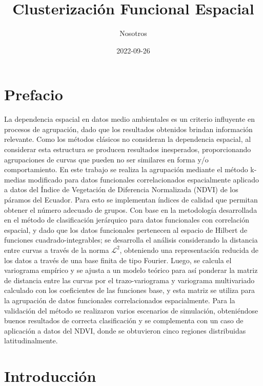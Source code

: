 \documentclass[
]{book}
\title{Clusterización Funcional Espacial}
\author{Nosotros}
\date{2022-09-26}
\begin{document}
\maketitle

{
\setcounter{tocdepth}{1}
\tableofcontents
}
\hypertarget{prefacio}{%
\chapter*{Prefacio}\label{prefacio}}

La dependencia espacial en datos medio ambientales es un criterio influyente en procesos de agrupación, dado que los resultados obtenidos brindan información relevante. Como los métodos clásicos no consideran la dependencia espacial, al considerar esta estructura se producen resultados inesperados, proporcionando agrupaciones de curvas que pueden no ser similares en forma y/o comportamiento. En este trabajo se realiza la agrupación mediante el método k-medias modificado para datos funcionales correlacionados espacialmente aplicado a datos del Índice de Vegetación de Diferencia Normalizada (NDVI) de los páramos del Ecuador. Para esto se implementan índices de calidad que permitan obtener el número adecuado de grupos. Con base en la metodología desarrollada en el método de clasificación jerárquico para datos funcionales con correlación espacial, y dado que los datos funcionales pertenecen al espacio de Hilbert de funciones cuadrado-integrables; se desarrolla el análisis considerando la distancia entre curvas a través de la norma \(\mathcal{L}^2\), obteniendo una representación reducida de los datos a través de una base finita de tipo Fourier. Luego, se calcula el variograma empírico y se ajusta a un modelo teórico para así ponderar la matriz de distancia entre las curvas por el trazo-variograma y variograma multivariado calculado con los coeficientes de las funciones base, y esta matriz se utiliza para la agrupación de datos funcionales correlacionados espacialmente. Para la validación del método se realizaron varios escenarios de simulación, obteniéndose buenos resultados de correcta clasificación y se complementa con un caso de aplicación a datos del NDVI, donde se obtuvieron cinco regiones distribuidas latitudinalmente.

\hypertarget{introducciuxf3n}{%
\chapter{Introducción}\label{introducciuxf3n}}
\end{document}
